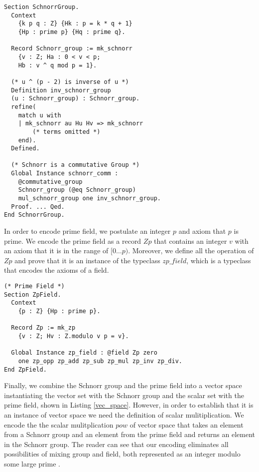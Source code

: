 \documentclass[conference,compsoc]{IEEEtran}
\begin{document}
 \begin{lstlisting}[frame=single, language=Coq, caption={Coq Encoding of the Schnorr Group},
  label={group_def},captionpos=t, basicstyle=\ttfamily\footnotesize,
  abovecaptionskip=-\medskipamount]
Section SchnorrGroup. 
  Context 
    {k p q : Z} {Hk : p = k * q + 1}
    {Hp : prime p} {Hq : prime q}.

  Record Schnorr_group := mk_schnorr 
    {v : Z; Ha : 0 < v < p; 
    Hb : v ^ q mod p = 1}.

  (* u ^ (p - 2) is inverse of u *)
  Definition inv_schnorr_group 
  (u : Schnorr_group) : Schnorr_group.
  refine(
    match u with 
    | mk_schnorr au Hu Hv => mk_schnorr
        (* terms omitted *)
    end).
  Defined.

  (* Schnorr is a commutative Group *)
  Global Instance schnorr_comm : 
    @commutative_group 
    Schnorr_group (@eq Schnorr_group) 
    mul_schnorr_group one inv_schnorr_group.
  Proof. ... Qed. 
End SchnorrGroup.
\end{lstlisting}


In order to encode prime field, we postulate an integer $p$ and 
axiom that $p$ is prime. We encode the prime field as 
a record $Zp$ that contains an integer $v$ with an axiom 
that it is in the range of $[0 \ldots p)$. Moreover, 
we define all the operation of $Zp$ and prove that 
it is an instance of the typeclass $zp\_field$, which is 
a typeclass that encodes the axioms of a field. 

\begin{lstlisting}[frame=single, language=Coq, caption={Coq Encoding of Prime Field},
  label={field_def},captionpos=t, basicstyle=\ttfamily\footnotesize,
  abovecaptionskip=-\medskipamount]
(* Prime Field *)
Section ZpField.
  Context 
    {p : Z} {Hp : prime p}.

  Record Zp := mk_zp 
    {v : Z; Hv : Z.modulo v p = v}.

  Global Instance zp_field : @field Zp zero 
    one zp_opp zp_add zp_sub zp_mul zp_inv zp_div.
End ZpField. 
\end{lstlisting}

Finally, we combine the Schnorr group and the prime field 
into a vector space instantiating the vector set with 
the Schnorr group and the scalar set with the prime field, 
shown in Listing \ref{vec_space}. 
However, in order to establish that it is an 
instance of vector space we need the definition 
of scalar mulitiplication. We encode the  
the scalar mulitplication $pow$ of 
vector space that takes an element from 
a Schnorr group and an element from 
the prime field and returns an element in the 
Schnorr group.  The reader can see that our encoding eliminates all 
possibilities of mixing group and field, both represented 
as an integer modulo some large 
prime \cite{10.1007/978-3-662-63958-0_24}.
\end{document}
